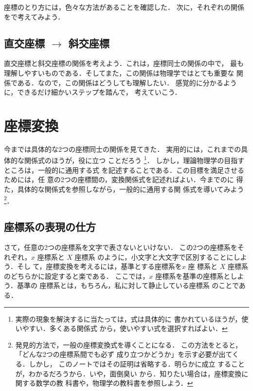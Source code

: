                 座標のとり方には，色々な方法があることを確認した．
                次に，それぞれの関係をで考えてみよう．

                    \subsection{直交座標 $\rightarrow$ 斜交座標}
                         直交座標と斜交座標の関係を考えよう．これは，座標同士の関係の中で，
                         最も理解しやすいものである．そしてまた，この関係は物理学ではとても重要な
                         関係である．なので，この関係はどうしても理解したい．
                         感覚的に分かるように，できるだけ細かいステップを踏んで，
                         考えていこう．

\section{座標変換}
                今までは具体的な2つの座標同士の関係を見てきた．
                実用的には，これまでの具体的な関係式のほうが，役に立つ
                ことだろう
                    \footnote{
                        実際の現象を解決するに当たっては，式は具体的に
                        書かれているほうが，使いやすい．多くある関係式
                        から，使いやすい式を選択すればよい．
                    }．
                しかし，理論物理学の目指すところは，一般的に通用する式
                を記述することである．この目標を満足させるためには，任
                意の2つの座標間の，変換関係式を記述ればよい．今までのに
                得た，具体的な関係式を参照しながら，一般的に通用する関
                係式を導いてみよう
                    \footnote{
                        発見的方法で，一般の座標変換式を導くことになる．
                        この方法をとると，「どんな2つの座標系間でも必ず
                        成り立つかどうか」を示す必要が出てくる．しかし，
                        このノートではその証明は省略する．明らかに成立
                        することが，わかるだろうから．いや，面倒臭い
                        から．知りたい場合は，座標変換に関する数学の教
                        科書や，物理学の教科書を参照しよう．
                    }．

                \subsection{座標系の表現の仕方}
                    さて，任意の2つの座標系を文字で表さないといけない．
                    この2つの座標系をそれぞれ，$x$ 座標系と $X$ 座標系
                    のように，小文字と大文字で区別することにしよう．そし
                    て，座標変換を考えるには，基準とする座標系を$x$ 座
                    標系と $X$ 座標系のどちらかに設定すると楽である．
                    ここでは，$x$ 座標系を基準の座標系としよう．基準の
                    座標系とは，もちろん，私に対して静止している座標系
                    のことである．

